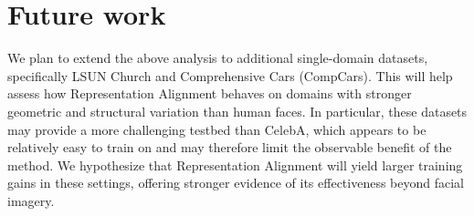 \section{Future work}

We plan to extend the above analysis to additional single-domain datasets, specifically LSUN Church and Comprehensive Cars (CompCars).
This will help assess how Representation Alignment behaves on domains with stronger geometric and structural variation than human faces.
In particular, these datasets may provide a more challenging testbed than CelebA, which appears to be relatively easy to train on and may
therefore limit the observable benefit of the method. We hypothesize that Representation Alignment will yield larger training gains in these
settings, offering stronger evidence of its effectiveness beyond facial imagery.
